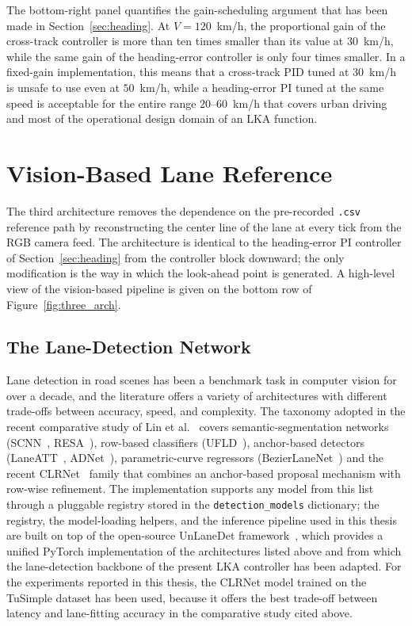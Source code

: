 The bottom-right panel quantifies the gain-scheduling argument that has been made in Section~\ref{sec:heading}. At $V = 120$~km/h, the proportional gain of the cross-track controller is more than ten times smaller than its value at $30$~km/h, while the same gain of the heading-error controller is only four times smaller. In a fixed-gain implementation, this means that a cross-track PID tuned at $30$~km/h is unsafe to use even at $50$~km/h, while a heading-error PI tuned at the same speed is acceptable for the entire range $20$--$60$~km/h that covers urban driving and most of the operational design domain of an \ac{LKA} function.

\section{Vision-Based Lane Reference}
\label{sec:vision}
The third architecture removes the dependence on the pre-recorded \texttt{.csv} reference path by reconstructing the center line of the lane at every tick from the RGB camera feed. The architecture is identical to the heading-error PI controller of Section~\ref{sec:heading} from the controller block downward; the only modification is the way in which the look-ahead point is generated. A high-level view of the vision-based pipeline is given on the bottom row of Figure~\ref{fig:three_arch}.

\subsection{The Lane-Detection Network}
Lane detection in road scenes has been a benchmark task in computer vision for over a decade, and the literature offers a variety of architectures with different trade-offs between accuracy, speed, and complexity. The taxonomy adopted in the recent comparative study of Lin et al.~\cite{lin2024lane} covers semantic-segmentation networks (SCNN~\cite{scnn}, RESA~\cite{resa}), row-based classifiers (UFLD~\cite{ufld}), anchor-based detectors (LaneATT~\cite{laneatt}, ADNet~\cite{adnet}), parametric-curve regressors (BezierLaneNet~\cite{beziernet}) and the recent CLRNet~\cite{clrnet} family that combines an anchor-based proposal mechanism with row-wise refinement. The implementation supports any model from this list through a pluggable registry stored in the \texttt{detection\_models} dictionary; the registry, the model-loading helpers, and the inference pipeline used in this thesis are built on top of the open-source UnLaneDet framework~\cite{unlanedet}, which provides a unified PyTorch implementation of the architectures listed above and from which the lane-detection backbone of the present \ac{LKA} controller has been adapted. For the experiments reported in this thesis, the CLRNet model trained on the TuSimple dataset has been used, because it offers the best trade-off between latency and lane-fitting accuracy in the comparative study cited above.

